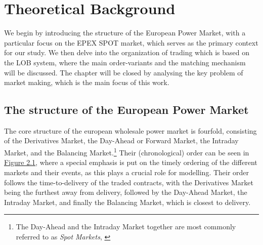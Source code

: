 \documentclass[12pt,a4paper]{cau_thesis}
\begin{document}
\chapter{Theoretical Background}\label{ch:theoretical_background}
We begin by introducing the structure of the European Power Market,
with a particular focus on the EPEX SPOT market, which serves as the
primary context for our study. We then delve into the organization of
trading which is based on the LOB system, where the main
order-variants and the matching mechanism will be discussed. The
chapter will be closed by analysing the key problem of market making,
which is the main focus of this work.
\section{The structure of the European Power Market}\label{sec:structure_european_power_market}
The core structure of the european wholesale power market is
fourfold, consisting of the Derivatives Market, the Day-Ahead or
Forward Market, the Intraday Market, and the Balancing
Market.\footnote{The Day-Ahead and the Intraday Market together are
    most commonly referred to as \textit{Spot Markets}, \cite[see ][,
        p.136.]{bnetza_monitoringreport_energy_2025}} Their (chronological)
order can be seen in
\hyperref[fig:european_power_market_design]{Figure 2.1}, where a
special emphasis is put on the timely ordering of the different
markets and their events, as this plays a crucial role for modelling.
Their order follows the time-to-delivery of the traded contracts,
with the Derivatives Market being the furthest away from delivery,
followed by the Day-Ahead Market, the Intraday Market, and finally
the Balancing Market, which is closest to delivery.
\begin{figure}[htbp]
    \vspace*{0.5cm}
    \centering
    \label{fig:european_power_market_design}
\end{figure}
\end{document}

